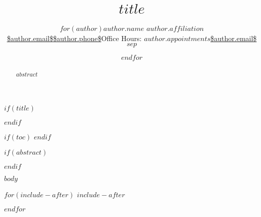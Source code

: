 \documentclass[$paper$,$sides$,$fontsize$]{memoir}
\title{\bigskip \bigskip $title$}
\author{$for(author)$\Large $author.name$\vspace{0.05in} \newline\normalsize\emph{$author.affiliation$} \newline\footnotesize \url{$author.email$}\vspace*{0.2in}\newline \footnotesize \url{$author.phone$}\vspace*{0.2in}\newline \footnotesize{Office Hours: }\href{https://$author.appointments$}{\texttt{$author.appointments$}}\vspace*{0.2in}\newline \newline \footnotesize \url{$author.email$}\vspace*{0.2in}\newline  $sep$ \and $endfor$}
\date{}
\begin{document}
  

$if(title)$
\maketitle
$endif$





$if(toc)$
{
\hypersetup{linkcolor=black}
\setcounter{tocdepth}{$toc-depth$}
\tableofcontents
}
$endif$


$if(abstract)$

\begin{abstract}

\noindent $abstract$

\end{abstract}

$endif$



$body$



$for(include-after)$
$include-after$

$endfor$
\end{document}
